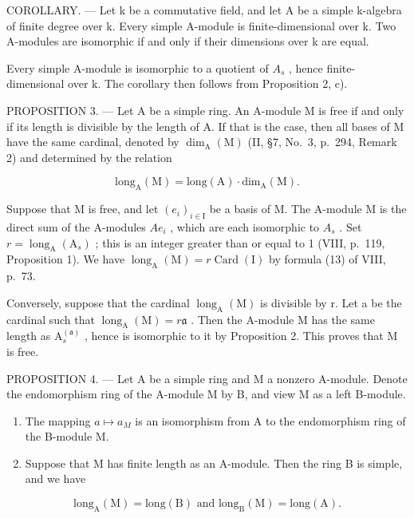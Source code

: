 COROLLARY. --- Let k be a commutative field, and let A be a simple k-algebra of finite degree over k. Every simple A-module is finite-dimensional over k. Two A-modules are isomorphic if and only if their dimensions over k are equal.

Every simple A-module is isomorphic to a quotient of \(A_{s}\) , hence finite-dimensional over k. The corollary then follows from Proposition 2, c).

PROPOSITION 3. --- Let A be a simple ring. An A-module M is free if and only if its length is divisible by the length of A. If that is the case, then all bases of M have the same cardinal, denoted by \(\dim_{\mathrm{A}}(\mathrm{M})\) (II, §7, No.~3, p.~294, Remark 2) and determined by the relation

\[
\mathrm{long} _ {\mathrm{A}} (\mathrm{M}) = \mathrm{long} (\mathrm{A}) \cdot \mathrm{dim} _ {\mathrm{A}} (\mathrm{M}).\tag{1}
\]

Suppose that M is free, and let \((e_{i})_{i\in\mathrm{I}}\) be a basis of M. The A-module M is the direct sum of the A-modules \(Ae_{i}\) , which are each isomorphic to \(A_{s}\) . Set \(r=\operatorname{long}_{\mathrm{A}}(\mathrm{A}_{s})\) ; this is an integer greater than or equal to 1 (VIII, p.~119, Proposition 1). We have \(\operatorname{long}_{\mathrm{A}}(\mathrm{M})=r\operatorname{Card}(\mathrm{I})\) by formula (13) of VIII, p.~73.

Conversely, suppose that the cardinal \(\operatorname{long}_{\mathrm{A}}(\mathrm{M})\) is divisible by r. Let a be the cardinal such that \(\operatorname{long}_{\mathrm{A}}(\mathrm{M}) = r\mathfrak{a}\) . Then the A-module M has the same length as \(\mathrm{A}_{s}^{(\mathfrak{a})}\) , hence is isomorphic to it by Proposition 2. This proves that M is free.

PROPOSITION 4. --- Let A be a simple ring and M a nonzero A-module. Denote the endomorphism ring of the A-module M by B, and view M as a left B-module.

\begin{enumerate}
\def\labelenumi{\alph{enumi})}
\item
  The mapping \(a \mapsto a_{M}\) is an isomorphism from A to the endomorphism ring of the B-module M.
\item
  Suppose that M has finite length as an A-module. Then the ring B is simple, and we have
\end{enumerate}

\[
\mathrm{long} _ {\mathrm{A}} (\mathrm{M}) = \mathrm{long} (\mathrm{B}) \text{ and } \mathrm{long} _ {\mathrm{B}} (\mathrm{M}) = \mathrm{long} (\mathrm{A}).\tag{2}
\]

